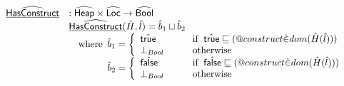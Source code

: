 \documentclass{article}
\makeatletter
\newcommand{\SF}[1]{\mbox{\textsf{#1}}}
\newcommand{\wherec}[1]{{\rm where}\begin{array}[t]{l}#1\end{array}}
\newcommand{\ifc}[1]{{\rm if}\begin{array}[t]{l}#1\end{array}}
\newcommand{\owc}{{\rm otherwise}}
\newcommand{\abs}[1]{\widehat{\SF{#1}}}
\newcommand{\aHeap}{\abs{Heap}}
\newcommand{\aLoc}{\abs{Loc}}
\newcommand{\ahf}[1]{\widehat{\underline{\sf #1}}}
\newcommand{\varprop}[1]{@#1}
\newcommand{\atrue}{\hat{\SF{true}}}
\newcommand{\afalse}{\hat{\SF{false}}}
\makeatother
\begin{document}
\[\begin{array}{ll}
\ahf{HasConstruct} & : \aHeap \times \aLoc \rightarrow \abs{Bool} \\
& \ahf{HasConstruct}(\hat{H},\hat{l})
  = \hat{b}_1\sqcup\hat{b}_2 \\
& \quad\wherec{
  \hat{b}_1 = 
    \left\{
      \begin{array}{l@{\quad\quad\quad}l}
        \atrue &\ifc{\atrue\sqsubseteq(\varprop{construct} \dot{\in} dom(\hat{H}(\hat{l})))}\\
        \bot_{Bool} &\owc
      \end{array}
    \right.\\
  \hat{b}_2 = 
    \left\{
      \begin{array}{l@{\quad\quad\quad}l}
        \afalse &\ifc{\afalse\sqsubseteq(\varprop{construct} \dot{\in} dom(\hat{H}(\hat{l})))}\\
        \bot_{Bool} &\owc
      \end{array}
    \right.\\

  }\\\\
\end{array}
\]
\end{document}
